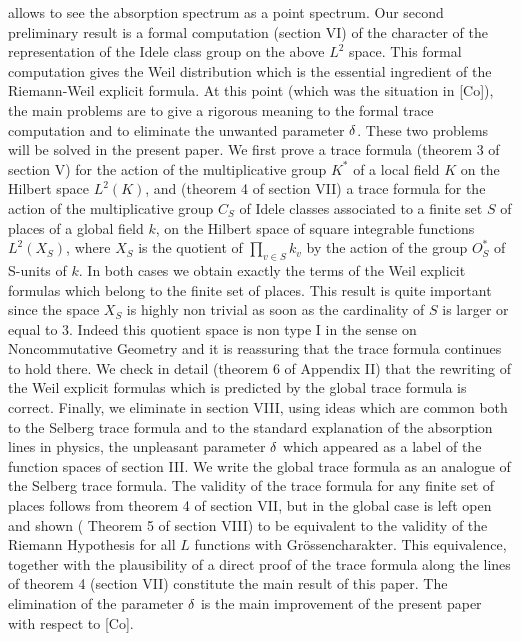 allows to see the absorption spectrum as a point spectrum. 
\smallskip
Our second preliminary result is a formal computation (section VI) of 
the character of the representation of the Idele class group on the 
above $L^2$ space. This formal computation gives the Weil distribution 
which is the essential ingredient of the Riemann-Weil explicit formula. 
At this point (which was the situation in [Co]), the main problems are 
to give a rigorous meaning to the formal trace computation and to 
eliminate the unwanted parameter $\delta$.
\smallskip
These two problems will be solved in the present paper. We first prove a 
trace formula (theorem 3 of section V) for the action of the 
multiplicative group $K^*$ of a local field $K$
on the Hilbert space $L^2 (K)$, and (theorem 4 of section VII) a trace 
formula for the action of the multiplicative group $C_S$ of Idele 
classes associated to a finite set $S$ of places of a global field $k$, 
on the Hilbert space of square integrable functions $L^2 (X_S)$, where 
$X_S$ is the quotient of $\prod_{v \in S} k_v$ by the action of the 
group $O^*_S$ of S-units of $k$. In both cases we obtain exactly the 
terms of the Weil explicit formulas which belong to the finite set of 
places. This result is quite important since the space $X_S$ is highly 
non trivial as soon as the cardinality of $S$ is larger or equal to $3$. 
Indeed this quotient space is non type I in the sense on Noncommutative 
Geometry and it is reassuring that the trace formula continues to hold 
there.
\smallskip
We check in detail (theorem 6 of Appendix II) that the rewriting of the 
Weil explicit formulas which is predicted by the global trace formula is 
correct.
\smallskip
 Finally, we eliminate in section VIII, using ideas which are common 
both to the Selberg trace formula and to the standard explanation of the 
absorption lines in physics, the unpleasant parameter $\delta$ which 
appeared as a label of the function spaces of section III. We write the 
global trace formula as an analogue of the Selberg trace formula.
The validity of the trace formula for any finite set of places follows 
from theorem 4 of section VII, but in the global case is left open and 
shown ( Theorem 5 of section VIII) to be equivalent to the validity of 
the Riemann Hypothesis for all $L$ functions with Gr\"ossencharakter. 
This equivalence, together with the plausibility of a direct proof of 
the trace formula along the lines of theorem 4 (section VII) constitute 
the main result of this paper.
The elimination of the parameter $\delta$ is the main improvement of the 
present paper with respect to [Co].\smallskip

